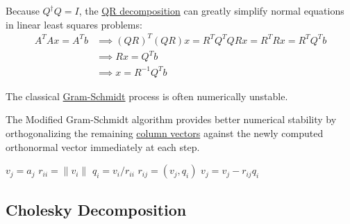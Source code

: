   Because $Q^\dagger Q = I$, the \hyperref[def:qr-decomposition]{QR decomposition} can greatly simplify normal equations in linear least squares problems:
  \begin{align}
    A^T A x = A^T b & \implies (Q R)^T (Q R) x = R^T Q^T Q R x = R^T R x = R^T Q^T b \\
    & \implies R x = Q^T b \\
    & \implies x = R^{-1} Q^T b
  \end{align}

  The classical \hyperref[thm:gram-schmidt]{Gram-Schmidt} process is often numerically unstable. 

  \begin{algo}
    The Modified Gram-Schmidt algorithm provides better numerical stability by orthogonalizing the remaining \hyperref[def:column-vector]{column vectors} against the newly computed orthonormal vector immediately at each step. 
    \begin{algorithmic}[1]
        \STATE $v_j = a_j$
      \ENDFOR
        \STATE $r_{ii} = \|v_i\|$
        \STATE $q_i = v_i / r_{ii}$
          \STATE $r_{ij} = (v_j, q_i)$
          \STATE $v_j = v_j - r_{ij} q_i$
        \ENDFOR
      \ENDFOR
    \end{algorithmic}
  \end{algo}

\subsection{Cholesky Decomposition}

